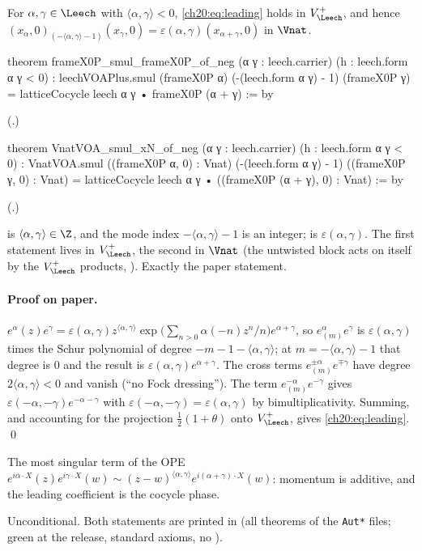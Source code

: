 \begin{lemma}\label{ch20:lem:leading}
For $\alpha,\gamma\in\Leech$ with $\langle\alpha,\gamma\rangle<0$, \eqref{ch20:eq:leading} holds in $\chtwentyVL$, and
hence $(x_\alpha,0)_{(-\langle\alpha,\gamma\rangle-1)}(x_\gamma,0)=\varepsilon(\alpha,\gamma)(x_{\alpha+\gamma},0)$ in $\Vnat$.
\end{lemma}
\begin{leancode}
theorem frameX0P_smul_frameX0P_of_neg (α γ : leech.carrier) (h : leech.form α γ < 0) :
    leechVOAPlus.smul (frameX0P α) (-(leech.form α γ) - 1) (frameX0P γ)
      = latticeCocycle leech α γ • frameX0P (α + γ) := by
\end{leancode}
(.)
\begin{leancode}
theorem VnatVOA_smul_xN_of_neg (α γ : leech.carrier) (h : leech.form α γ < 0) :
    VnatVOA.smul ((frameX0P α, 0) : Vnat) (-(leech.form α γ) - 1) ((frameX0P γ, 0) : Vnat)
      = latticeCocycle leech α γ • ((frameX0P (α + γ), 0) : Vnat) := by
\end{leancode}
(.)
\begin{dictionary}
 is $\langle\alpha,\gamma\rangle\in\Z$, and the mode index $-\langle\alpha,\gamma\rangle-1$ is an
integer;  is $\varepsilon(\alpha,\gamma)$.  The first statement lives in $\chtwentyVL$, the
second in $\Vnat$ (the untwisted block acts on itself by the $\chtwentyVL$ products, ).  Exactly
the paper statement.
\end{dictionary}
\paragraph{Proof on paper.}  $e^\alpha(z)e^\gamma=\varepsilon(\alpha,\gamma)z^{\langle\alpha,\gamma\rangle}\exp\bigl(\sum_{n>0}
\alpha(-n)z^n/n\bigr)e^{\alpha+\gamma}$, so $e^\alpha_{(m)}e^\gamma$ is $\varepsilon(\alpha,\gamma)$ times the Schur polynomial of
degree $-m-1-\langle\alpha,\gamma\rangle$; at $m=-\langle\alpha,\gamma\rangle-1$ that degree is $0$ and the result is
$\varepsilon(\alpha,\gamma)e^{\alpha+\gamma}$.  The cross terms $e^{\pm\alpha}_{(m)}e^{\mp\gamma}$ have degree $2\langle\alpha,\gamma\rangle<0$
and vanish (``no Fock dressing'').  The term $e^{-\alpha}_{(m)}e^{-\gamma}$ gives $\varepsilon(-\alpha,-\gamma)e^{-\alpha-\gamma}$ with
$\varepsilon(-\alpha,-\gamma)=\varepsilon(\alpha,\gamma)$ by bimultiplicativity.  Summing, and accounting for the projection
$\tfrac12(1+\theta)$ onto $\chtwentyVL$, gives \eqref{ch20:eq:leading}. \qed
\begin{physics}
The most singular term of the OPE $e^{i\alpha\cdot X}(z)e^{i\gamma\cdot X}(w)\sim(z-w)^{\langle\alpha,\gamma\rangle}e^{i(\alpha+\gamma)\cdot X}(w)$:
momentum is additive, and the leading coefficient is the cocycle phase.
\end{physics}
\begin{status}
Unconditional.  Both statements are printed in  (all theorems of the \texttt{Aut*} files; green at the release, standard axioms, no ).
\end{status}

